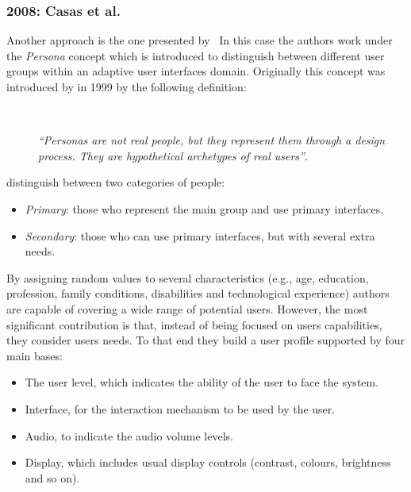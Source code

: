 
\subsubsection{2008: Casas et al.}
\label{sec:casas}

Another approach is the one presented by~\citet{casas_user_2008} In this case 
the authors work under the \textit{Persona} concept which is introduced to 
distinguish between different user groups within an adaptive user interfaces
domain. Originally this concept was introduced by \citeauthor{cooper_inmates_2004} 
in 1999 by the following definition:

\begin{description}
  \item[] \hfill \\
  \begin{mdframed}[hidealllines=true,backgroundcolor=gray!20]
  \textit{``Personas are not real people, but they represent them through a design 
  process. They are hypothetical archetypes of real users''}. 
  \end{mdframed}
\end{description}

\citeauthor{casas_user_2008} distinguish between two categories of people:

\begin{itemize}
 \item \textit{Primary}: those who represent the main group and use primary 
 interfaces. 
 \item \textit{Secondary}: those who can use primary interfaces, but with 
 several extra needs.
\end{itemize}

By assigning random values to several characteristics (e.g., age, education,
profession, family conditions, disabilities and technological experience) 
authors are capable of covering a wide range of potential users. However, the 
most significant contribution is that, instead of being focused on users 
capabilities, they consider users needs. To that end they build a user 
profile supported by four main bases: 

\begin{itemize}
 \item The user level, which indicates the ability of the user to face the 
 system.
 \item Interface, for the interaction mechanism to be used by the user.
 \item Audio, to indicate the audio volume levels.
 \item Display, which includes usual display controls (contrast, colours, 
 brightness and so on).
\end{itemize}

